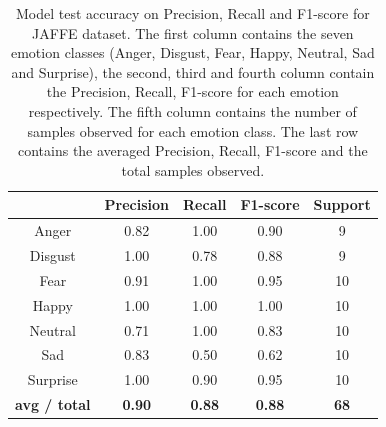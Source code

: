 \documentclass[master]{thesis-uestc}
\begin{document}
\begin{table}[ht]
\renewcommand{\arraystretch}{1.3}
\caption{Model test accuracy on Precision, Recall and F1-score for JAFFE dataset. The first column contains the seven emotion classes (Anger, Disgust, Fear, Happy, Neutral, Sad and Surprise), the second, third and fourth column contain the Precision, Recall, F1-score for each emotion respectively. The fifth column contains the number of samples observed for each emotion class. The last row contains the averaged Precision, Recall, F1-score and the total samples observed.}
\label{table_jaffe_scores}
\begin{center}
\begin{tabular}{|c|c|c|c|c|}

\hline
 & Precision & Recall & F1-score & Support\\ \hline

Anger & 0.82 & 1.00 & 0.90 & 9\\ \hline
Disgust & 1.00 & 0.78 & 0.88 & 9\\ \hline
Fear & 0.91 & 1.00 & 0.95 & 10\\ \hline
Happy & 1.00 & 1.00 & 1.00 & 10\\ \hline
Neutral & 0.71 & 1.00 & 0.83 & 10\\ \hline
Sad & 0.83 & 0.50 & 0.62 & 10\\ \hline
Surprise & 1.00 & 0.90 & 0.95 & 10\\ \hline

\textbf{avg / total} & \textbf{0.90} & \textbf{0.88} & \textbf{0.88} & \textbf{68}\\ \hline
\end{tabular}
\end{center}
\end{table}
\end{document}
